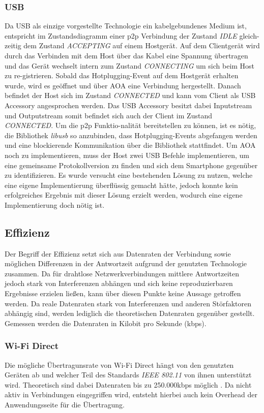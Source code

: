      \subsubsection{USB} Da USB als einzige vorgestellte Technologie ein kabelgebundenes Medium ist, \linebreak entspricht im Zustandsdiagramm einer p2p Verbindung der Zustand {\it IDLE} gleich-zeitig dem Zustand {\it ACCEPTING} auf einem Hostgerät. Auf dem Clientgerät wird durch das Verbinden mit dem Host über das Kabel eine Spannung übertragen und das Gerät wechselt intern zum Zustand {\it CONNECTING} um sich beim Host zu re-gistrieren. Sobald das Hotplugging-Event auf dem Hostgerät erhalten wurde, wird es geöffnet und über AOA eine Verbindung hergestellt. Danach befindet der Host sich im Zustand {\it CONNECTED} und kann vom Client als USB Accessory angesprochen werden. Das USB Accessory besitzt dabei Inputstream und Outputstream somit befindet sich auch der Client im Zustand {\it CONNECTED}.
     Um die p2p Funktio-nalität bereitstellen zu können, ist es nötig, die Bibliothek {\it libusb} so anzubinden, dass Hotplugging-Events abgefangen werden und eine blockierende Kommunikation über die Bibliothek stattfindet. Um AOA noch zu implementieren, muss der Host zwei USB Befehle implementieren, um eine gemeinsame Protokollversion zu finden und sich dem Smartphone gegenüber zu identifizieren. Es wurde versucht eine bestehenden Lösung zu nutzen, welche eine eigene Implementierung überflüssig gemacht hätte, jedoch konnte kein erfolgreiches Ergebnis mit dieser Lösung erzielt werden, wodurch eine eigene Implementierung doch nötig ist.
		
		\subsection{Effizienz}
	   Der Begriff der Effizienz setzt sich aus Datenraten der Verbindung sowie möglichen Differenzen in der Antwortzeit aufgrund der genutzten Technologie zusammen. Da für drahtlose Netzwerkverbindungen mittlere Antwortzeiten jedoch stark von Interferenzen abhängen und sich keine reproduzierbaren Ergebnisse erzielen ließen, kann über diesen Punkte keine Aussage getroffen werden. Da reale Datenraten stark von Interferenzen und anderen Störfaktoren abhängig sind, werden lediglich die theoretischen Datenraten gegenüber gestellt. Gemessen werden die Datenraten in Kilobit pro Sekunde (kbps).

		\subsubsection{Wi-Fi Direct} Die mögliche Übertragunsrate von Wi-Fi Direct hängt von den genutzten Geräten ab und welcher Teil des Standards {\it IEEE 802.11} von ihnen unterstützt wird. Theoretisch sind dabei Datenraten bis zu 250.000kbps möglich \cite{wifiRate}. Da nicht aktiv in Verbindungen eingegriffen wird, entsteht hierbei auch kein Overhead der Anwendungsseite für die Übertragung.
		
